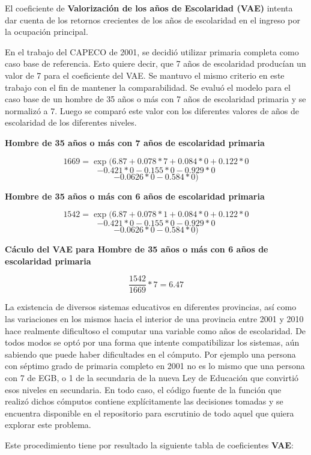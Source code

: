 El coeficiente de \textbf{Valorización de los años de Escolaridad (VAE)} intenta dar cuenta de los retornos crecientes de los años de escolaridad en el ingreso por la ocupación principal.
 
En el trabajo del CAPECO de 2001, se decidió utilizar primaria completa como caso base de referencia. Esto quiere decir, que 7 años de escolaridad producían un valor de 7 para el coeficiente del VAE. Se mantuvo el mismo criterio en este trabajo con el fin de mantener la comparabilidad. Se evaluó el modelo para el caso base de un hombre de 35 años o más con 7 años de escolaridad primaria y se normalizó a 7. Luego se comparó este valor con los diferentes valores de años de escolaridad de los diferentes niveles.

\textbf{Hombre de 35 años o más con 7 años de escolaridad primaria}

$$1669 = \exp (6.87 + 0.078 * 7 + 0.084 * 0 + 0.122 * 0 $$
$$ - 0.421 * 0 - 0.155 * 0 - 0.929 * 0  $$
$$-0.0626 * 0 - 0.584 * 0) $$

\textbf{Hombre de 35 años o más con 6 años de escolaridad primaria}

$$1542 = \exp (6.87 + 0.078 * 1 + 0.084 * 0 + 0.122 * 0 $$
$$ - 0.421 * 0 - 0.155 * 0 - 0.929 * 0  $$
$$-0.0626 * 0 - 0.584 * 0) $$

\textbf{Cáculo del VAE para Hombre de 35 años o más con 6 años de escolaridad primaria}

$$\frac{1542}{1669}  * 7  = 6.47$$

La existencia de diversos sistemas educativos en diferentes provincias, así como las variaciones en los mismos hacia el interior de una provincia entre 2001 y 2010 hace realmente dificultoso el computar una variable como años de escolaridad. De todos modos se optó por una forma que intente compatibilizar los sistemas, aún sabiendo que puede haber dificultades en el cómputo. Por ejemplo una persona con séptimo grado de primaria completo en 2001 no es lo mismo que una persona con 7 de EGB, o 1 de la secundaria de la nueva Ley de Educación que convirtió esos niveles en secundaria. En todo caso, el código fuente de la función que realizó dichos cómputos contiene explícitamente las decisiones tomadas y se encuentra disponible en el repositorio para escrutinio de todo aquel que quiera explorar este problema.

Este procedimiento tiene por resultado la siguiente tabla de coeficientes \textbf{VAE}:

